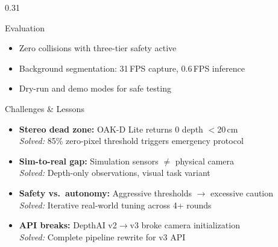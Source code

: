\documentclass[final]{beamer}
\begin{document}
\begin{frame}[t, fragile]{}
\begin{columns}[t,totalwidth=\textwidth]
\begin{column}{0.31\textwidth}
\begin{alertblock}{Evaluation}
\centering
\vspace{0.2cm}
\vspace{0.2cm}

\begin{itemize}
  \item Zero collisions with three-tier safety active
  \item Background segmentation: 31\,FPS capture, 0.6\,FPS inference
  \item Dry-run and demo modes for safe testing
\end{itemize}
\end{alertblock}

\begin{block}{Challenges \& Lessons}
\begin{itemize}
  \item \textbf{Stereo dead zone:} OAK-D Lite returns 0 depth $<$20\,cm\\
        \textit{Solved:} 85\% zero-pixel threshold triggers emergency protocol
  \item \textbf{Sim-to-real gap:} Simulation sensors $\ne$ physical camera\\
        \textit{Solved:} Depth-only observations, visual task variant
  \item \textbf{Safety vs.\ autonomy:} Aggressive thresholds $\to$ excessive caution\\
        \textit{Solved:} Iterative real-world tuning across 4+ rounds
  \item \textbf{API breaks:} DepthAI v2$\to$v3 broke camera initialization\\
        \textit{Solved:} Complete pipeline rewrite for v3 API
\end{itemize}
\end{block}


\end{column}
\end{columns}
\end{frame}
\end{document}

